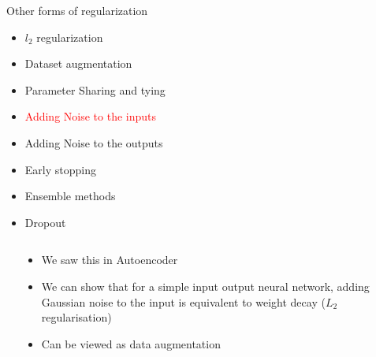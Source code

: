 \begin{frame}
\end{frame}

\begin{frame}
	\vspace{4em}
	\begin{overlayarea}{\textwidth}{\textheight}
		\begin{block}{Other forms of regularization}
			\begin{itemize}
				\item $l_2$ regularization
				\item Dataset augmentation
				\item Parameter Sharing and tying
				\item \textcolor<2->{red}{Adding Noise to the inputs }
				\item Adding Noise to the outputs 
				\item Early stopping
				\item Ensemble methods
				\item Dropout
			\end{itemize}
		\end{block}
	\end{overlayarea}
\end{frame}
			

\begin{frame}
	\begin{columns}
							

		\begin{overlayarea}{\textheight}{\textwidth}
			
		\end{overlayarea}
							
							
		\begin{overlayarea}{\textwidth}{\textheight}
			\begin{itemize}
				\justifying
				\item<2-> We saw this in Autoencoder
				\item<3-> We can show that for a simple input output neural network, adding Gaussian noise to the input is equivalent to weight decay ($L_2$ regularisation)
				\item<4-> Can be viewed as data augmentation
			\end{itemize}
									
		\end{overlayarea}
							
	\end{columns}
\end{frame}
			
